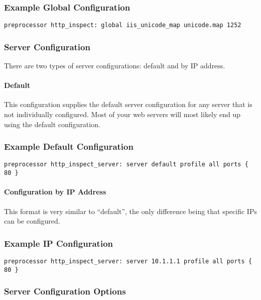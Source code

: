 \documentclass[english]{report}
\begin{document}
\subsubsection{Example Global Configuration}

\begin{verbatim}
preprocessor http_inspect: global iis_unicode_map unicode.map 1252
\end{verbatim}

\subsubsection{Server Configuration}
There are two types of server configurations: default and by IP address.

\paragraph{Default}

This configuration supplies the default server configuration for any server
that is not individually configured.  Most of your web servers will most likely
end up using the default configuration.

\subsubsection{Example Default Configuration}
\begin{verbatim}
preprocessor http_inspect_server: server default profile all ports { 80 }
\end{verbatim}

\paragraph{Configuration by IP Address}
This format is very similar to ``default'', the only difference being that
specific IPs can be configured.

\subsubsection{Example IP Configuration}
\begin{verbatim}
preprocessor http_inspect_server: server 10.1.1.1 profile all ports { 80 }
\end{verbatim}

\subsubsection{Server Configuration Options}
\end{document}
